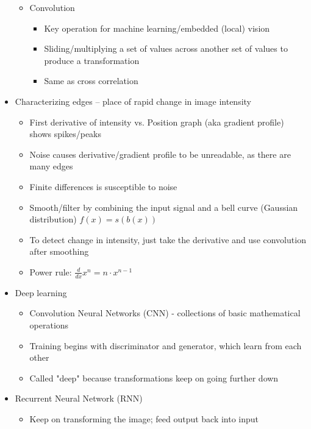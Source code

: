 \documentclass{article}
\begin{document}
\begin{itemize}
\begin{itemize}
\begin{itemize}
\end{itemize}
\item Convolution 
\begin{itemize}
\item Key operation for machine learning/embedded (local) vision 
\item Sliding/multiplying a set of values across another set of values to produce a transformation 
\item Same as cross correlation 
\end{itemize}
\end{itemize}
\item Characterizing edges – place of rapid change in image intensity 
\begin{itemize}
\item First derivative of intensity vs. Position graph (aka gradient profile)  shows spikes/peaks  
\item Noise causes derivative/gradient profile to be unreadable, as there are many edges 
\item Finite differences is susceptible to noise 
\item Smooth/filter by combining the input signal and a bell curve (Gaussian distribution) $f(x)=s(b(x))$ 
\item To detect change in intensity, just take the derivative and use convolution after smoothing 
\item Power rule: $\frac{d}{dx}x^n=n\cdot x^{n-1}$ 
\end{itemize}
\item Deep learning
\begin{itemize}
\item Convolution Neural Networks (CNN) - collections of basic mathematical operations 
\item Training begins with discriminator and generator, which learn from each other 
\item Called "deep" because transformations keep on going further down
\end{itemize}
\item Recurrent Neural Network (RNN)
\begin{itemize}
\item Keep on transforming the image; feed output back into input
\end{itemize}
\end{itemize}
\end{document}
